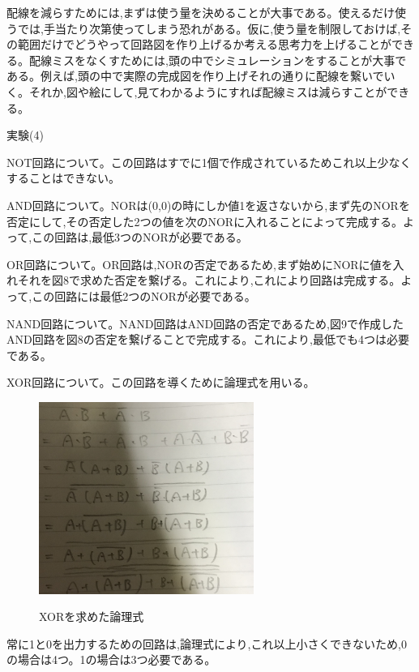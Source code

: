 \documentclass[a4paper,11pt,titlepage]{jarticle}
\begin{document}
配線を減らすためには,まずは使う量を決めることが大事である。使えるだけ使うでは,手当たり次第使ってしまう恐れがある。仮に,使う量を制限しておけば,その範囲だけでどうやって回路図を作り上げるか考える思考力を上げることができる。配線ミスをなくすためには,頭の中でシミュレーションをすることが大事である。例えば,頭の中で実際の完成図を作り上げそれの通りに配線を繋いでいく。それか,図や絵にして,見てわかるようにすれば配線ミスは減らすことができる。\par
実験(4)\par
NOT回路について。この回路はすでに1個で作成されているためこれ以上少なくすることはできない。\par
AND回路について。NORは(0,0)の時にしか値1を返さないから,まず先のNORを否定にして,その否定した2つの値を次のNORに入れることによって完成する。よって,この回路は,最低3つのNORが必要である。\par
OR回路について。OR回路は,NORの否定であるため,まず始めにNORに値を入れそれを図8で求めた否定を繋げる。これにより,これにより回路は完成する。よって,この回路には最低2つのNORが必要である。\par
NAND回路について。NAND回路はAND回路の否定であるため,図9で作成したAND回路を図8の否定を繋げることで完成する。これにより,最低でも4つは必要である。\par
XOR回路について。この回路を導くために論理式を用いる。\par

\begin{figure}[htbp]
  \centering
  \includegraphics[width=70mm]{sample19.png}
  \label{sample15}\\
  \caption{XORを求めた論理式}
\end{figure}
\par

常に1と0を出力するための回路は,論理式により,これ以上小さくできないため,0の場合は4つ。1の場合は3つ必要である。\par
\end{document}
